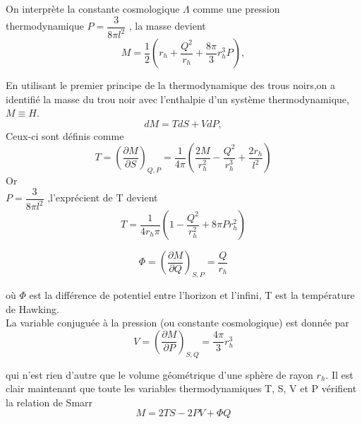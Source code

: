 \documentclass[12pt,  a4paper, openright]{report} %
\begin{document}
On interprète la constante cosmologique $\Lambda$ comme une pression thermodynamique $P=\dfrac{3}{8\pi l^{2}}$ , la masse devient
\begin{equation}
M=\dfrac{1}{2} \left( r_{h}+\dfrac{Q^{2}}{r_{h}}+\dfrac{8\pi}{3}r_{h}^{3}P\right) ,
\end{equation}

En utilisant le premier principe de la thermodynamique des trous noirs,on a identifié la masse du trou noir avec l’enthalpie d’un système thermodynamique, $M \equiv H$.
\begin{equation}
dM=TdS+VdP,
\end{equation}
Ceux-ci sont définis comme
\begin{equation}
T=(\dfrac{\partial M}{\partial S})_{Q,P}=\dfrac{1}{4\pi}(\dfrac{2M}{r_{h}^{2}}-\dfrac{Q^{2}}{r_{h}^{3}}+\dfrac{2r_{h}}{l^{2}})
\end{equation}
Or\\
$P=\dfrac{3}{8\pi l^{2}} $ ,l'exprécient de T devient
\begin{equation}
\label{yy}
T=\dfrac{1}{4r_{h}\pi}(1-\dfrac{Q^{2}}{r_{h}^{2}}+8\pi Pr_{h}^{2})
\end{equation}

\begin{equation}
\Phi=(\dfrac{\partial M}{\partial Q})_{S,P}=\dfrac{Q}{r_{h}}
\end{equation}

où $\Phi$ est la différence de potentiel entre l'horizon et l'infini, T est la température de  Hawking.\\

La variable conjuguée à la pression (ou constante cosmologique) est donnée par
\begin{equation}
V=(\dfrac{\partial M}{\partial P})_{S,Q} =\dfrac{4\pi}{3}r_{h}^{3}
\end{equation}

qui n’est rien d’autre que le volume géométrique d’une sphère de rayon $r_{h}$. Il est clair
maintenant que toute les variables thermodynamiques T, S, V et P vérifient la relation
de Smarr \cite{17}
\begin{equation}
M=2TS-2PV+\Phi Q
\end{equation}
\end{document}
